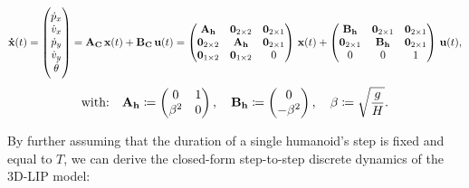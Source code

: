 \begin{equation} \notag
\mathbf{\dot{x}}(t) = 
\begin{pmatrix}
    \dot{p}_{x}\\
    \dot{v}_{x}\\
    \dot{p}_{y}\\
    \dot{v}_{y}\\
    \dot{\theta}
\end{pmatrix} =
\mathbf{A_C} \, \mathbf{x}(t) + \mathbf{B_C} \, \mathbf{u}(t) =
\begin{pmatrix}
    \mathbf{A_h} & \mathbf{0}_{2 \times 2} & \mathbf{0}_{2 \times 1} \\
    \mathbf{0}_{2 \times 2} & \mathbf{A_h} & \mathbf{0}_{2 \times 1} \\
    \mathbf{0}_{1 \times 2} & \mathbf{0}_{1 \times 2} & 0 \\
\end{pmatrix} \, \mathbf{x}(t) +
\begin{pmatrix}
    \mathbf{B_h} & \mathbf{0}_{2 \times 1} & \mathbf{0}_{2 \times 1} \\
    \mathbf{0}_{2 \times 1} & \mathbf{B_h} & \mathbf{0}_{2 \times 1} \\
    0 & 0 & 1\\
\end{pmatrix} \, \mathbf{u}(t),
\end{equation}
\begin{equation} \notag
\text{with:}\quad
\mathbf{A_h} \coloneq
\begin{pmatrix}
    0 & 1 \\
    \beta^2 & 0
\end{pmatrix},
\quad
\mathbf{B_h} \coloneq
\begin{pmatrix}
    0 \\
    -\beta^2
\end{pmatrix}, \quad
\beta \coloneqq \sqrt{\frac{g}{H}}.
\end{equation}

By further assuming that the duration of a single humanoid's step is fixed and equal to $T$, we can derive the closed-form step-to-step discrete dynamics of the 3D-LIP model:

